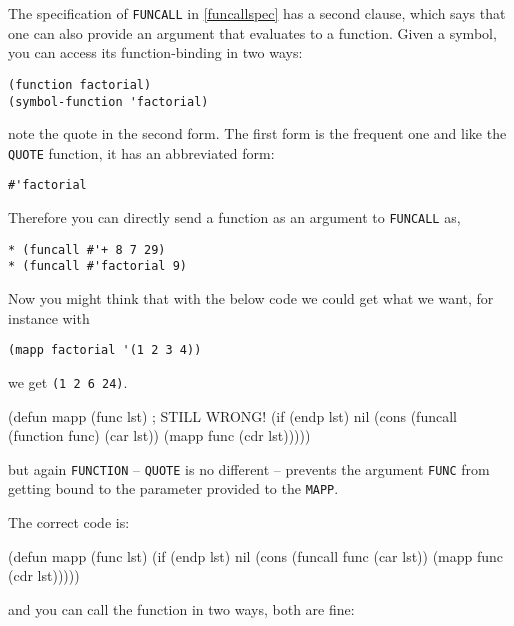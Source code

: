\documentclass[a4paper,11pt]{article}
\begin{document}
\begin{uenum}
\begin{uenumi}
\begin{uenumi}
\item The specification of \Verb+FUNCALL+ in \ref{funcallspec} has a second clause, which says that one can also provide an argument that evaluates to a function. Given a symbol, you can access its function-binding in two ways:

\begin{ucodeframe}
\begin{Verbatim}
(function factorial)
(symbol-function 'factorial)
\end{Verbatim}
\end{ucodeframe}

note the quote in the second form. The first form is the frequent one and like the \Verb+QUOTE+ function, it has an abbreviated form:

\begin{ucodeframe}
\begin{Verbatim}
#'factorial
\end{Verbatim}
\end{ucodeframe}

Therefore you can directly send a function as an argument to \Verb+FUNCALL+ as,

\begin{ucodeframe}
\begin{Verbatim}
* (funcall #'+ 8 7 29)
* (funcall #'factorial 9)
\end{Verbatim}
\end{ucodeframe}

\end{uenumi}


\item\label{stillwrong} Now you might think that with the below code we could get what we want, for instance with

\Verb+(mapp factorial '(1 2 3 4))+

we get \Verb+(1 2 6 24)+. 

{\small
\begin{lispcode}
(defun mapp (func lst) ; STILL WRONG!
  (if (endp lst)
	nil
	(cons (funcall (function func) (car lst)) (mapp func (cdr lst)))))
\end{lispcode}
}
but again \Verb+FUNCTION+ -- \Verb+QUOTE+ is no different -- prevents the argument 
\Verb+FUNC+ from getting bound to the parameter provided to the \Verb+MAPP+.

The correct code is:

\begin{lispcode}
(defun mapp (func lst)
  (if (endp lst)
	nil
	(cons (funcall func (car lst)) (mapp func (cdr lst)))))
\end{lispcode}
and you can call the function in two ways, both are fine:


\end{uenumi}
\end{uenum}
\end{document}

